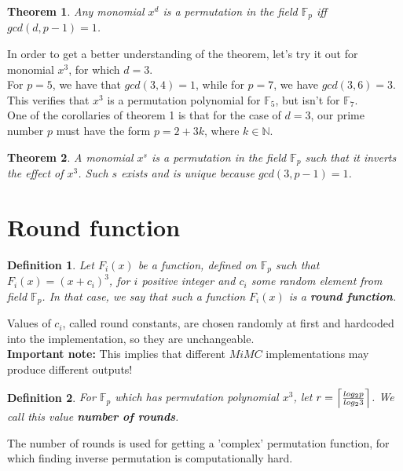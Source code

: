 \documentclass[letterpaper, bothsides, 12pt]{article} %
\DeclarePairedDelimiter\ceil{\lceil}{\rceil}
\newtheorem{definition}{Definition}
\newtheorem{theorem}{Theorem}
\begin{document}
\begin{theorem} 
Any monomial $x^d$ is a permutation in the field $\mathbb{F}_p$ iff $gcd(d, p-1) = 1$.
\end{theorem}

In order to get a better understanding of the theorem, let's try it out for monomial $x^3$, for which $d=3$. \\
For $p=5$, we have that $gcd(3, 4) = 1$, while for $p=7$, we have $gcd(3, 6) = 3$. \\
This verifies that $x^3$ is a permutation polynomial for $\mathbb{F}_5$, but isn't for $\mathbb{F}_7$. \\

One of the corollaries of theorem 1 is that for the case of $d=3$, our prime number $p$ must have the form $p = 2 + 3k$, where $k \in \mathbb{N}$.

\begin{theorem} 
A monomial $x^s$ is a permutation in the field $\mathbb{F}_p$ such that it inverts the effect of $x^3$. Such $s$ exists and is unique because $gcd(3, p-1) = 1$.
\end{theorem}

\section{Round function}

\begin{definition}
Let $F_i(x)$ be a function, defined on $\mathbb{F}_p$ such that $F_i(x) = (x + c_i) ^ 3$, for $i$  positive integer and $c_i$ some random element from field $\mathbb{F}_p$. In that case, we say that such a function $F_i(x)$ is a \textbf{round function}. 
\end{definition}

Values of $c_i$, called round constants, are chosen randomly at first and hardcoded into the implementation, so they are unchangeable. \\
\textbf{Important note:} This implies that different $MiMC$ implementations may produce different outputs!
\begin{definition}
For $\mathbb{F}_p$ which has permutation polynomial $x^3$, let $r = \ceil*{\frac{log_2 p}{log_2 3}}$. We call this value \textbf{number of rounds}.
\end{definition} 

The number of rounds is used for getting a 'complex' permutation function, for which finding inverse permutation is computationally hard.
\end{document}
